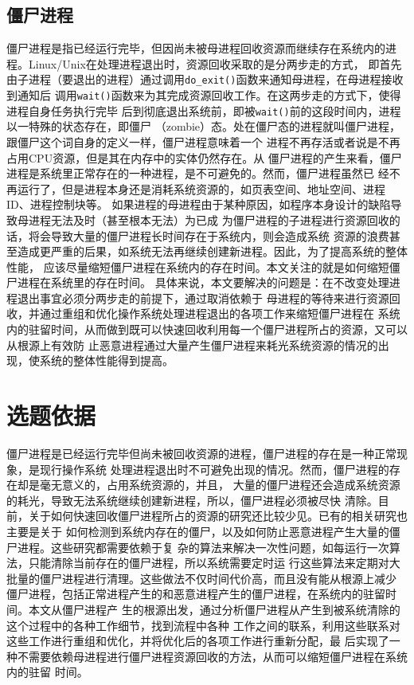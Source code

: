 \documentclass{swfuthesism}
\begin{document}
\subsection{僵尸进程}
\label{sec:zombie}

僵尸进程是指已经运行完毕，但因尚未被母进程回收资源而继续存在系统内的进
程\cite{bovet2005understanding}。Linux/Unix在处理进程退出时，资源回收采取的是分两步走的方式，
即首先由子进程（要退出的进程）通过调用\texttt{do\_exit()}函数来通知母进程，在母进程接收到通知后
调用\texttt{wait()}函数来为其完成资源回收工作。在这两步走的方式下，使得进程自身任务执行完毕
后到彻底退出系统前，即被\texttt{wait()}前的这段时间内，进程以一特殊的状态存在，即僵尸
（zombie）态。处在僵尸态的进程就叫僵尸进程，跟僵尸这个词自身的定义一样，僵尸进程意味着一个
进程不再存活或者说是不再占用CPU资源，但是其在内存中的实体仍然存在\cite{wiki:zombieproc}。从
僵尸进程的产生来看，僵尸进程是系统里正常存在的一种进程，是不可避免的。然而，僵尸进程虽然已
经不再运行了，但是进程本身还是消耗系统资源的，如页表空间、地址空间、进程ID、进程控制块等。
如果进程的母进程由于某种原因，如程序本身设计的缺陷导致母进程无法及时（甚至根本无法）为已成
为僵尸进程的子进程进行资源回收的话，将会导致大量的僵尸进程长时间存在于系统内，则会造成系统
资源的浪费甚至造成更严重的后果，如系统无法再继续创建新进程。因此，为了提高系统的整体性能，
应该尽量缩短僵尸进程在系统内的存在时间。本文关注的就是如何缩短僵尸进程在系统里的存在时间。
具体来说，本文要解决的问题是：在不改变处理进程退出事宜必须分两步走的前提下，通过取消依赖于
母进程的等待来进行资源回收，并通过重组和优化操作系统处理进程退出的各项工作来缩短僵尸进程在
系统内的驻留时间，从而做到既可以快速回收利用每一个僵尸进程所占的资源，又可以从根源上有效防
止恶意进程通过大量产生僵尸进程来耗光系统资源的情况的出现，使系统的整体性能得到提高。

\section{选题依据}

僵尸进程是已经运行完毕但尚未被回收资源的进程，僵尸进程的存在是一种正常现象，是现行操作系统
处理进程退出时不可避免出现的情况。然而，僵尸进程的存在却是毫无意义的，占用系统资源的，并且，
大量的僵尸进程还会造成系统资源的耗光，导致无法系统继续创建新进程，所以，僵尸进程必须被尽快
清除。目前，关于如何快速回收僵尸进程所占的资源的研究还比较少见。已有的相关研究也主要是关于
如何检测到系统内存在的僵尸，以及如何防止恶意进程产生大量的僵尸进程。这些研究都需要依赖于复
杂的算法来解决一次性问题，如每运行一次算法，只能清除当前存在的僵尸进程，所以系统需要定时运
行这些算法来定期对大批量的僵尸进程进行清理。这些做法不仅时间代价高，而且没有能从根源上减少
僵尸进程，包括正常进程产生的和恶意进程产生的僵尸进程，在系统内的驻留时间。本文从僵尸进程产
生的根源出发，通过分析僵尸进程从产生到被系统清除的这个过程中的各种工作细节，找到流程中各种
工作之间的联系，利用这些联系对这些工作进行重组和优化，并将优化后的各项工作进行重新分配，最
后实现了一种不需要依赖母进程进行僵尸进程资源回收的方法，从而可以缩短僵尸进程在系统内的驻留
时间。
\end{document}
